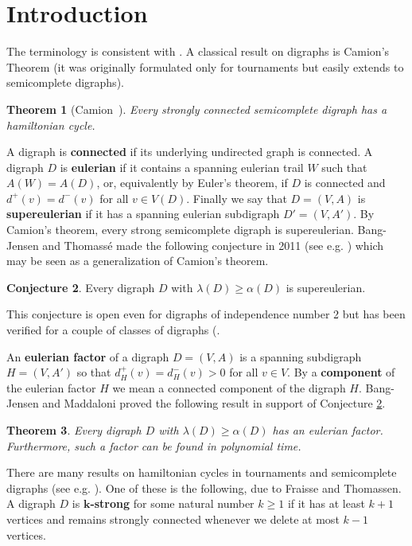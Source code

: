 \documentclass{article}
\newcommand{\2}{\vspace{2mm}}
\theoremstyle{plain}
\newtheorem{theorem}{Theorem}
\theoremstyle{definition}
\newtheorem{conjecture}[theorem]{Conjecture}
\begin{document}
\section{Introduction}
The terminology is consistent with \cite{bang2009}.
 A  classical result on digraphs is  Camion's Theorem
(it was  originally formulated only for tournaments but   easily extends to semicomplete digraphs). 

\begin{theorem}[Camion~\cite{Cami59}]\label{thm:camion}
Every strongly connected  semicomplete digraph has a hamiltonian cycle.
\end{theorem}

A digraph is {\bf connected} if its
underlying undirected graph is connected.
A digraph $D$ is {\bf eulerian} if it contains a spanning eulerian trail $W$ such that $A(W)=A(D)$, or, equivalently by Euler's theorem, if $D$ is connected and $d^+(v)=d^-(v)$ for all $v\in V(D)$.
Finally we say that $D=(V,A)$ is {\bf supereulerian} if it has a spanning eulerian subdigraph $D'=(V,A')$.
By Camion's theorem, every strong semicomplete digraph is supereulerian. Bang-Jensen and Thomass\'e made the following conjecture in 2011 (see e.g. \cite{bangJGT79}) which may be seen as a generalization of Camion's theorem.


\begin{conjecture}
  \label{conj:BJTh}
  Every digraph $D$ with $\lambda{}(D)\geq \alpha{}(D)$ is supereulerian.
\end{conjecture}

This conjecture is open even for digraphs of independence number 2 but has been verified for a couple of classes of digraphs (\cite{alsatamiAM7,bangJGT79}.

An {\bf eulerian factor} of a digraph $D=(V,A)$ is a spanning subdigraph $H=(V,A')$ so that $d_H^+(v)=d_H^-(v)>0$ for all $v\in V$. 
By a {\bf component} of the eulerian factor $H$  we mean a connected component of the digraph $H$.
Bang-Jensen and Maddaloni proved the following result in support of Conjecture \ref{conj:BJTh}.

\begin{theorem}\cite{bangJGT79}
  \label{lem:efactoravoid}
  Every digraph $D$ with $\lambda{}(D)\geq\alpha{}(D)$ has an eulerian factor. Furthermore, such a factor can be found in polynomial time.
\end{theorem}



  There are many results on hamiltonian cycles in tournaments and semicomplete digraphs
  (see e.g. \cite{bangTchapter,kuehnEJC33}). One of these is the following, due to Fraisse and Thomassen. A digraph $D$ is {\bf $\mathbf{k}$-strong} for some natural number $k\geq 1$ if it has at least $k+1$ vertices and remains strongly connected  whenever we delete at most $k-1$ vertices. 
\end{document}
